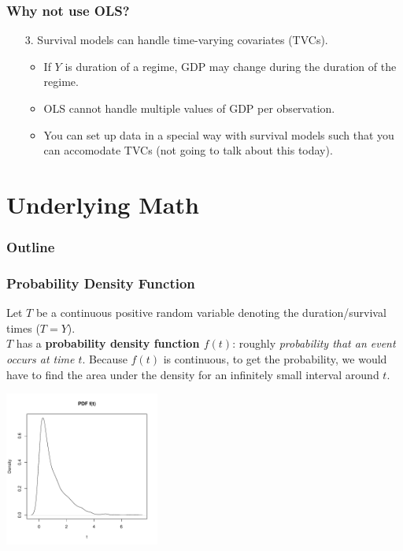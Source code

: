 \documentclass[handout]{beamer}
\begin{document}
\begin{frame}
\frametitle{Why not use OLS?}
\begin{enumerate}
\item[3.] Survival models can handle time-varying covariates (TVCs).
\begin{itemize}
\pause
\item If $Y$ is duration of a regime, GDP may change during the
duration of the regime.
\pause
\item OLS cannot handle multiple values of GDP per observation.
\pause
\item You can set up data in a special way with survival models such
that you can accomodate TVCs (not going to talk about this today).
\end{itemize}
\end{enumerate}
\end{frame}

\section{Underlying Math}

\begin{frame}
\frametitle{Outline}
\tableofcontents[currentsection]
\end{frame}

\begin{frame}
\frametitle{Probability Density Function}
\pause
Let $T$ be a continuous positive random variable denoting the duration/survival
times ($T = Y$).\\
\pause
\bigskip
$T$ has a \textbf{probability density function $f(t)$}: roughly
\emph{probability that an event occurs at time $t$}.
\pause
Because $f(t)$ is continuous, to get the probability, we would have to find the area
under the density for an infinitely small interval around $t$.
\pause
\begin{center}
\includegraphics[width = 2in, height = 2in]{survival_present-pdf.pdf}
\end{center}
\end{frame}
\end{document}
